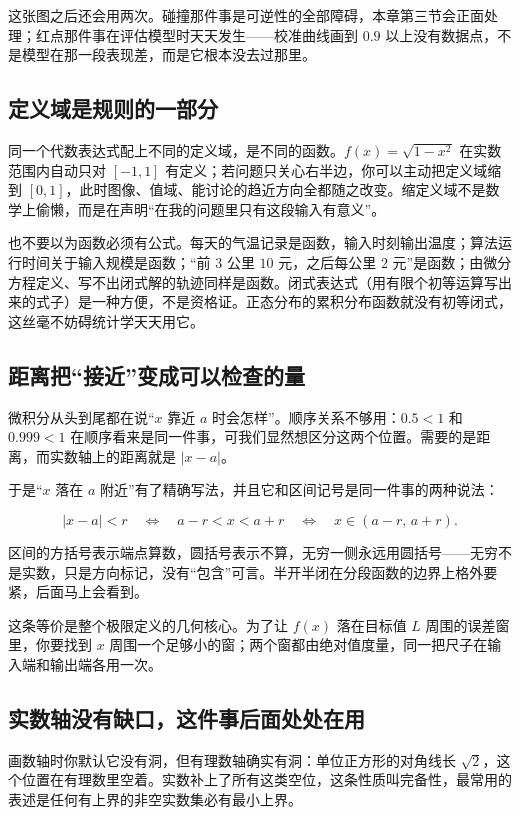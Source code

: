 这张图之后还会用两次。碰撞那件事是可逆性的全部障碍，本章第三节会正面处理；红点那件事在评估模型时天天发生——校准曲线画到 \(0.9\) 以上没有数据点，不是模型在那一段表现差，而是它根本没去过那里。

\subsection{定义域是规则的一部分}

同一个代数表达式配上不同的定义域，是不同的函数。\(f(x)=\sqrt{1-x^2}\) 在实数范围内自动只对 \([-1,1]\) 有定义；若问题只关心右半边，你可以主动把定义域缩到 \([0,1]\)，此时图像、值域、能讨论的趋近方向全都随之改变。缩定义域不是数学上偷懒，而是在声明``在我的问题里只有这段输入有意义''。

也不要以为函数必须有公式。每天的气温记录是函数，输入时刻输出温度；算法运行时间关于输入规模是函数；``前 \(3\) 公里 \(10\) 元，之后每公里 \(2\) 元''是函数；由微分方程定义、写不出闭式解的轨迹同样是函数。闭式表达式（用有限个初等运算写出来的式子）是一种方便，不是资格证。正态分布的累积分布函数就没有初等闭式，这丝毫不妨碍统计学天天用它。

\subsection{距离把``接近''变成可以检查的量}

微积分从头到尾都在说``\(x\) 靠近 \(a\) 时会怎样''。顺序关系不够用：\(0.5<1\) 和 \(0.999<1\) 在顺序看来是同一件事，可我们显然想区分这两个位置。需要的是距离，而实数轴上的距离就是 \(|x-a|\)。

于是``\(x\) 落在 \(a\) 附近''有了精确写法，并且它和区间记号是同一件事的两种说法：

\[
|x-a|<r
\quad\Longleftrightarrow\quad
a-r<x<a+r
\quad\Longleftrightarrow\quad
x\in(a-r,\,a+r).
\]

区间的方括号表示端点算数，圆括号表示不算，无穷一侧永远用圆括号——无穷不是实数，只是方向标记，没有``包含''可言。半开半闭在分段函数的边界上格外要紧，后面马上会看到。

这条等价是整个极限定义的几何核心。为了让 \(f(x)\) 落在目标值 \(L\) 周围的误差窗里，你要找到 \(x\) 周围一个足够小的窗；两个窗都由绝对值度量，同一把尺子在输入端和输出端各用一次。

\subsection{实数轴没有缺口，这件事后面处处在用}

画数轴时你默认它没有洞，但有理数轴确实有洞：单位正方形的对角线长 \(\sqrt2\)，这个位置在有理数里空着。实数补上了所有这类空位，这条性质叫完备性，最常用的表述是任何有上界的非空实数集必有最小上界。

